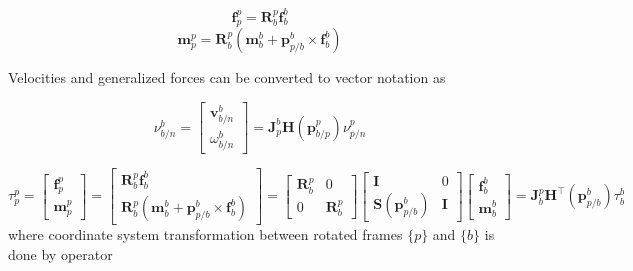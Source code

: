 \begin{equation}
	\textbf{f}_{p}^p = \textbf{R}_{b}^{p}\textbf{f}_{b}^b
	\label{eq:forceTranslated2R}
\end{equation}
\begin{equation}
	\textbf{m}_{p}^p = \textbf{R}_{b}^{p}(\textbf{m}_{b}^b + \textbf{p}_{p/b}^{b} \times \textbf{f}_{b}^b)
	\label{eq:momentTranslated2R}
\end{equation}

Velocities and generalized forces can be converted to vector notation as

\begin{equation}
	\nu_{b/n}^{b} = \begin{bmatrix}\textbf{v}_{b/n}^{b} \\[10pt] \omega_{b/n}^{b} \end{bmatrix} =  \textbf{J}_{p}^{b} \textbf{H}(\textbf{p}_{b/p}^{p}) \nu_{p/n}^{p}
	\label{eq:vectorSpeed2R}
\end{equation}

\begin{equation}
	\tau_{p}^{p} = \begin{bmatrix} \textbf{f}_{p}^{p} \\[10pt] 
		\textbf{m}_{p}^{p}
	\end{bmatrix} = \begin{bmatrix} \textbf{R}_{b}^{p}\textbf{f}_{b}^b \\[10pt] 
		\textbf{R}_{b}^{p}(\textbf{m}_{b}^b + \textbf{p}_{p/b}^{b} \times \textbf{f}_{b}^b)
	\end{bmatrix} = \begin{bmatrix} \textbf{R}_{b}^{p} & 0 \\[10pt] 
		0 & \textbf{R}_{b}^{p}\end{bmatrix} \begin{bmatrix} \textbf{I} & 0 \\[10pt] 
		\textbf{S}(\textbf{p}_{p/b}^{b}) & \textbf{I}\end{bmatrix} \begin{bmatrix} \textbf{f}_{b}^b \\[10pt] 
		\textbf{m}_{b}^{b}
	\end{bmatrix} = \textbf{J}_{b}^{p} \textbf{H}^\top (\textbf{p}_{p/b}^{b})  \tau_{b}^{b}
	\label{eq:forceMomentRotateAndTranslate1R}
\end{equation}
where coordinate system transformation between rotated frames $\{p\}$ and $\{b\}$ is done by operator 

